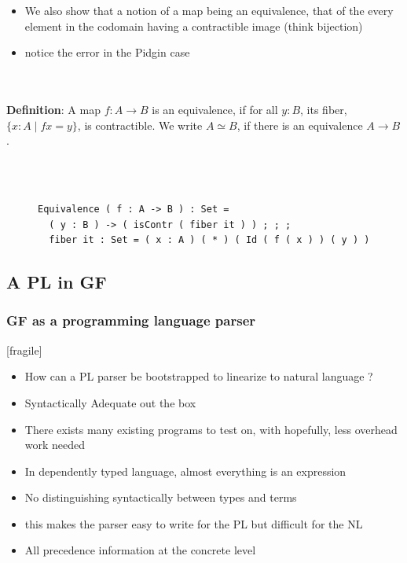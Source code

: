 \documentclass[10pt]{beamer}
\newcommand{\equalH}[2]{#1 = #2}
\newcommand{\comprehensionH}[3]{\{ #1 : #2 \mid #3 \}}
\newcommand{\arrowH}[2]{#1 \rightarrow #2}
\newcommand{\appH}[2]{#1 #2}
\newcommand{\equivalenceH}[2]{#1 \simeq #2}
\begin{document}
\begin{frame}[fragile]

\begin{itemize}
\item We also show that a notion of a map being an equivalence, that of the
  every element in the codomain having a contractible image (think bijection) 
\item notice the error in the Pidgin case
\end{itemize}

\\~\\

 \textbf{Definition}:
 A map $f : \arrowH {A}{B}$ is an equivalence, if for all $y : B$, its fiber, $\comprehensionH {x}{A}{\equalH {\appH {f}{x}}{y}}$, is contractible.
 We write $\equivalenceH {A}{B}$, if there is an equivalence $\arrowH {A}{B}$.

\\~\\

\begin{figure}
\begin{verbatim}
Equivalence ( f : A -> B ) : Set = 
  ( y : B ) -> ( isContr ( fiber it ) ) ; ; ; 
  fiber it : Set = ( x : A ) ( * ) ( Id ( f ( x ) ) ( y ) )
\end{verbatim}
\end{figure}


\end{frame}

\subsection{A PL in GF}

\begin{frame}
\frametitle{GF as a programming language parser}[fragile]

\begin{itemize}
\item How can a PL parser be bootstrapped to linearize to natural language ?
\item Syntactically Adequate out the box
\item There exists many existing programs to test on, with hopefully, less
  overhead work needed 
\item In dependently typed language, almost everything is an expression
\item No distinguishing syntactically between types and terms
\item this makes the parser easy to write for the PL but difficult for the NL
\item All precedence information at the concrete level
\end{itemize}

\end{frame}
\end{document}
